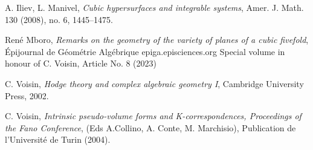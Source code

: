 \documentclass{article}
\theoremstyle{definition}
\begin{document}
\begin{thebibliography}{}
 A. Iliev, L. Manivel, \emph{Cubic hypersurfaces and integrable systems}, Amer. J. Math. 130 (2008), no. 6, 1445–1475.

 René Mboro, \emph{Remarks on the geometry of the variety of planes
of a cubic fivefold}, Épijournal de Géométrie Algébrique
epiga.episciences.org
Special volume in honour of C. Voisin, Article No. 8 (2023)

 C. Voisin, \emph{Hodge theory and complex algebraic geometry I}, Cambridge University Press, 2002.

 C. Voisin, \emph{Intrinsic pseudo-volume forms and K-correspondences, Proceedings of the Fano Conference}, (Eds
A.Collino, A. Conte, M. Marchisio), Publication de l’Université de Turin (2004).


\end{thebibliography}
\end{document}
